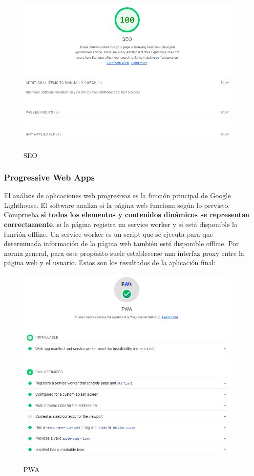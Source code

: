 \documentclass[12pt,twoside,titlepage]{report}
\begin{document}
\begin{figure}[H]
    \centering
    \includegraphics[scale=0.6]{Lighthouse/SEO}
    \label{fig:Lighthouse_seo}
    \caption{SEO}
\end{figure}

\subsubsection{Progressive Web Apps}

El análisis de aplicaciones web progresivas es la función principal de Google Lighthouse. El software analiza si la página web funciona según lo previsto. Comprueba \textbf{si todos los elementos y contenidos dinámicos se representan correctamente}, si la página registra un service worker y si está disponible la función offline. Un service worker es un script que se ejecuta para que determinada información de la página web también esté disponible offline. Por norma general, para este propósito suele establecerse una interfaz proxy entre la página web y el usuario. Estos son los resultados de la aplicación final:

\begin{figure}[H]
    \centering
    \includegraphics[scale=0.6]{Lighthouse/PWA}
    \label{fig:Lighthouse_PWA}
    \caption{PWA}
\end{figure}
\end{document}
